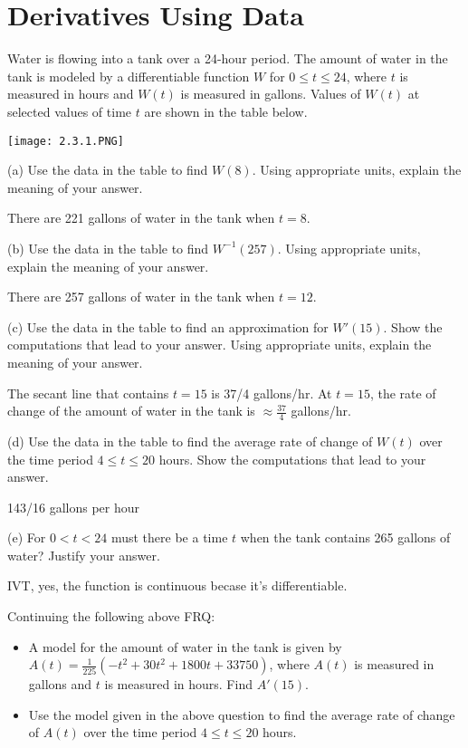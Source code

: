 \documentclass[../bccalc.tex]{subfiles}
\begin{document}
\section{Derivatives Using Data}
\begin{example}
    Water is flowing into a tank over a 24-hour period. The amount of water in the tank is modeled by a differentiable function $W$ for $0\leq t\leq 24$, where $t$ is measured in hours 
    and $W(t)$ is measured in gallons. Values of $W(t)$ at selected values of time $t$ are shown in the table below.
    \begin{center}
        \texttt{[image: 2.3.1.PNG]}
    \end{center}

    (a) Use the data in the table to find $W(8)$. Using appropriate units, explain the meaning of your answer.

    There are 221 gallons of water in the tank when $t=8$.

    (b) Use the data in the table to find $W^{-1}(257)$. Using appropriate units, explain the meaning of your answer.

    There are 257 gallons of water in the tank when $t=12$.

    (c) Use the data in the table to find an approximation for $W'(15)$. Show the computations that lead to your answer. Using appropriate units, explain the meaning of your answer.

    The secant line that contains $t=15$ is 37/4 gallons/hr. At $t=15$, the rate of change of the amount of water in the tank is $\approx \frac{37}{4}$ gallons/hr.

    (d) Use the data in the table to find the average rate of change of $W(t)$ over the time period $4\leq t\leq 20$ hours. Show the computations that lead to your answer.

    143/16 gallons per hour 

    (e) For $0<t<24$ must there be a time $t$ when the tank contains 265 gallons of water? Justify your answer.

    IVT, yes, the function is continuous becase it's differentiable.
\end{example}

\ex Continuing the following above FRQ:
\begin{itemize}
    \item A model for the amount of water in the tank is given by $A(t)=\frac{1}{225}(-t^2+30t^2+1800t+33750)$, where $A(t)$ is measured in gallons and $t$ is measured in hours. Find $A'(15)$.
    \item Use the model given in the above question to find the average rate of change of $A(t)$ over the time period $4\leq t\leq 20$ hours.
\end{itemize}
\end{document}
